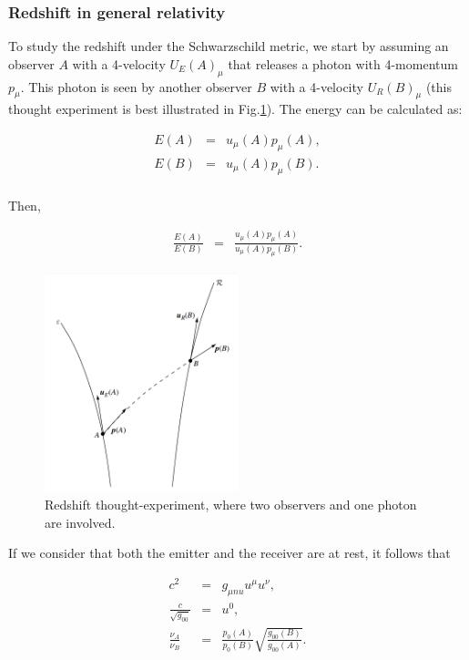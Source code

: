 \documentclass[letterpaper,11pt,onecolumn]{article}
\begin{document}
\subsubsection{Redshift in general relativity}

To study the redshift under the Schwarzschild metric, we start by assuming an observer $A$ with a 4-velocity $U_{E}(A)_{\mu}$ that releases a photon with 4-momentum $p_{\mu}$. This photon is seen by another observer $B$ with a 4-velocity $U_{R}(B)_{\mu}$ (this thought experiment is best illustrated in Fig.\ref{rs}). The energy can be calculated as:

\begin{eqnarray*}
          E(A)&=&u_{\mu}(A)p_{\mu}(A),\\
          E(B)&=&u_{\mu}(A)p_{\mu}(B).\\
\end{eqnarray*}

Then,

\begin{eqnarray*}
         \frac{E(A)}{E(B)} &=&\frac{u_{\mu}(A)p_{\mu}(A)}{u_{\mu}(A)p_{\mu}(B)}.
\end{eqnarray*}

\begin{figure}[h!]
    \centering
    \includegraphics[width=0.5\textwidth]{Report/Images/3_foton_redshift.png}
    \caption{Redshift thought-experiment, where two observers and one photon are involved.}
\label{rs}
\end{figure}

If we consider that both the emitter and the receiver are at rest, it follows that

        \begin{eqnarray*}
    c^{2}&=& g_{\mu nu} u^{\mu}u^{\nu}, \\     
            \frac{c}{\sqrt{g_{00}}}&=&u^{0},\\
         \frac{\nu_{A}}{\nu_{B}} &=&\frac{p_{0}(A)}{p_{0}(B)}  \sqrt{\frac{g_{00}(B)}{g_{00}(A)}}.
    \end{eqnarray*}
\end{document}
